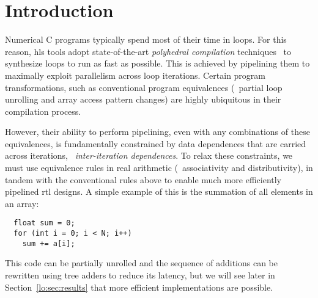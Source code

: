 \section{Introduction}
\label{lo:sec:introduction}


Numerical C programs typically spend most of their time in loops.  For this
reason, \gls{hls} tools adopt state-of-the-art \emph{polyhedral compilation}
techniques~\cite{canis14} to synthesize loops to run as fast as possible.  This
is achieved by pipelining them to maximally exploit parallelism across loop
iterations.  Certain program transformations, such as conventional program
equivalences (\eg~partial loop unrolling and array access pattern changes) are
highly ubiquitous in their compilation process.

However, their ability to perform pipelining, even with any combinations of
these equivalences, is fundamentally constrained by data dependences that
are carried across iterations, \ie~\emph{inter-iteration dependences}.  To
relax these constraints, we must use equivalence rules in real arithmetic
(\eg~associativity and distributivity), in tandem with the conventional rules
above to enable much more efficiently pipelined \gls{rtl} designs.  A simple
example of this is the summation of all elements in an array:
\begin{lstlisting}
  float sum = 0;
  for (int i = 0; i < N; i++)
    sum += a[i];
\end{lstlisting}
This code can be partially unrolled and the sequence of additions can be
rewritten using tree adders to reduce its latency, but we will see later in
Section~\ref{lo:sec:results} that more efficient implementations are possible.


